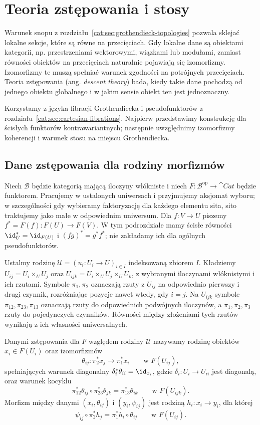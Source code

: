\section{Teoria zstępowania i stosy}\label{cat:sec:descent-stacks}

Warunek snopu z rozdziału~\ref{cat:sec:grothendieck-topologies} pozwala sklejać lokalne sekcje, które są równe na przecięciach. Gdy lokalne dane są obiektami kategorii, np. przestrzeniami wektorowymi, wiązkami lub modułami, zamiast równości obiektów na przecięciach naturalnie pojawiają się izomorfizmy. Izomorfizmy te muszą spełniać warunek zgodności na potrójnych przecięciach. Teoria zstępowania (ang. \emph{descent theory}) bada, kiedy takie dane pochodzą od jednego obiektu globalnego i w jakim sensie obiekt ten jest jednoznaczny.

Korzystamy z języka fibracji Grothendiecka i pseudofunktorów z rozdziału~\ref{cat:sec:cartesian-fibrations}. Najpierw przedstawimy konstrukcję dla ścisłych funktorów kontrawariantnych; następnie uwzględnimy izomorfizmy koherencji i warunek stosu na miejscu Grothendiecka.

\subsection{Dane zstępowania dla rodziny morfizmów}

Niech $\mathcal B$ będzie kategorią mającą iloczyny włókniste i niech $F:\mathcal B^{\mathrm{op}}\to\cat{Cat}$ będzie funktorem. Pracujemy w ustalonych uniwersach i przyjmujemy aksjomat wyboru; w szczególności gdy wybieramy faktoryzację dla każdego elementu sita, sito traktujemy jako małe w odpowiednim uniwersum. Dla $f:V\to U$ piszemy $f^*=F(f):F(U)\to F(V)$. W tym podrozdziale mamy ścisłe równości $\id_U^*=\id_{F(U)}$ i $(fg)^*=g^*f^*$; nie zakładamy ich dla ogólnych pseudofunktorów.

Ustalmy rodzinę $\mathcal U=(u_i:U_i\to U)_{i\in I}$ indeksowaną zbiorem $I$. Kładziemy $U_{ij}=U_i\times_U U_j$ oraz $U_{ijk}=U_i\times_U U_j\times_U U_k$, z wybranymi iloczynami włóknistymi i ich rzutami. Symbole $\pi_1,\pi_2$ oznaczają rzuty z $U_{ij}$ na odpowiednio pierwszy i drugi czynnik, rozróżniając pozycje nawet wtedy, gdy $i=j$. Na $U_{ijk}$ symbole $\pi_{12},\pi_{23},\pi_{13}$ oznaczają rzuty do odpowiednich podwójnych iloczynów, a $\pi_1,\pi_2,\pi_3$ rzuty do pojedynczych czynników. Równości między złożeniami tych rzutów wynikają z ich własności uniwersalnych.

\begin{definicja}\label{cat:def:descent-datum}
Danymi zstępowania dla $F$ względem rodziny $\mathcal U$ nazywamy rodzinę obiektów $x_i\in F(U_i)$ oraz izomorfizmów
\[
 \theta_{ij}:\pi_2^*x_j\longrightarrow\pi_1^*x_i
 \qquad\text{w } F(U_{ij}),
\]
spełniających warunek diagonalny $\delta_i^*\theta_{ii}=\id_{x_i}$, gdzie $\delta_i:U_i\to U_{ii}$ jest diagonalą, oraz warunek kocyklu
\[
 \pi_{12}^*\theta_{ij}\circ\pi_{23}^*\theta_{jk}
 =\pi_{13}^*\theta_{ik}\qquad\text{w }F(U_{ijk}).
\]
Morfizm między danymi $(x_i,\theta_{ij})$ i $(y_i,\psi_{ij})$ jest rodziną $h_i:x_i\to y_i$, dla której
\[
 \psi_{ij}\circ\pi_2^*h_j=\pi_1^*h_i\circ\theta_{ij}
 \qquad\text{w }F(U_{ij}).
\]
\end{definicja}


